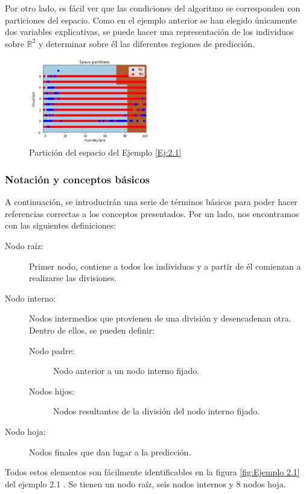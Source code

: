 \documentclass[12pt,twoside]{article}
\begin{document}
Por otro lado, es fácil ver que las condiciones del algoritmo se corresponden con particiones del espacio. Como en el ejemplo anterior se han elegido únicamente dos variables explicativas, se puede hacer una representación de los individuos sobre $\mathbb{R}^{2}$ y determinar sobre él las diferentes regiones de predicción.
\begin{figure}[h]
	\centering
	\includegraphics[width = 0.5\textwidth]{ex2_1_02}
	\caption{Partición del espacio del Ejemplo \ref{Ej:2.1}}
	\label{fig:Ejemplo 2.1.2}
\end{figure}


\subsubsection{Notación y conceptos básicos}

A continuación, se introducirán una serie de términos básicos para poder hacer referencias correctas a los conceptos presentados. Por un lado, nos encontramos con las siguientes definiciones:
\begin{description}
\item[Nodo raíz: ]Primer nodo, contiene a todos los individuos y a partir de él comienzan a realizarse las divisiones.
\item[Nodo interno: ]Nodos intermedios que provienen de una división y desencadenan otra. Dentro de ellos, se pueden definir:
	\begin{description}
	\item[Nodo padre: ]Nodo anterior a un nodo interno fijado.
	\item[Nodos hijos: ]Nodos resultantes de la división del nodo interno fijado.
	\end{description}
\item[Nodo hoja: ]Nodos finales que dan lugar a la predicción.
\end{description}

Todos estos elementos son fácilmente identificables en la figura \ref{fig:Ejemplo 2.1} del ejemplo 2.1 . Se tienen un nodo raíz, seis nodos internos y 8 nodos hoja.
\end{document}
